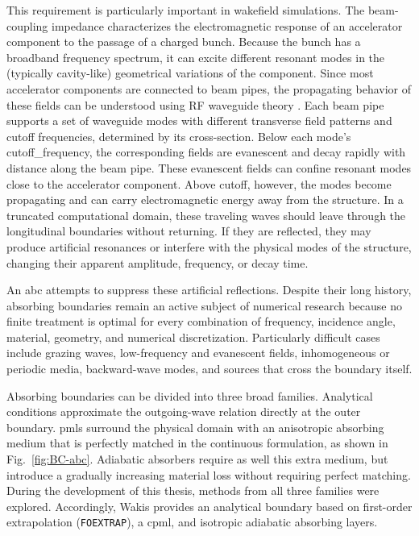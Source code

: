 This requirement is particularly important in wakefield simulations. The beam-coupling impedance characterizes the electromagnetic response of an accelerator component to the passage of a charged bunch. Because the bunch has a broadband frequency spectrum, it can excite different resonant modes in the (typically cavity-like) geometrical variations of the component. Since most accelerator components are connected to beam pipes, the propagating behavior of these fields can be understood using RF waveguide theory \cite{jensen_rf_2014}. Each beam pipe supports a set of \gls{waveguide modes} with different transverse field patterns and cutoff frequencies, determined by its cross-section. Below each mode's \gls{cutoff_frequency}, the corresponding fields are evanescent and decay rapidly with distance along the beam pipe. These evanescent fields can confine resonant modes close to the accelerator component. Above cutoff, however, the modes become propagating and can carry electromagnetic energy
away from the structure. In a truncated computational domain, these traveling waves should leave through the longitudinal boundaries without returning. If they are reflected, they may produce artificial resonances or interfere with the physical modes of the structure, changing their apparent amplitude, frequency, or decay time.

An \gls{abc} attempts to suppress these artificial reflections. Despite their long history, absorbing boundaries remain an active subject of numerical research because no finite treatment is optimal for every combination of frequency, incidence angle, material, geometry, and numerical discretization. Particularly difficult cases include grazing waves, low-frequency and evanescent fields, inhomogeneous or periodic media, backward-wave modes, and sources that cross the boundary itself.

Absorbing boundaries can be divided into three broad families. Analytical conditions approximate the outgoing-wave relation directly at the outer boundary. \Glspl{pml} surround the physical domain with an anisotropic absorbing medium that is perfectly matched in the continuous formulation, as shown in Fig.~\ref{fig:BC-abc}. Adiabatic absorbers require as well this extra medium, but introduce a gradually increasing material loss without requiring perfect matching. During the development of this thesis, methods from all three families were explored. Accordingly, Wakis provides an analytical boundary based on first-order extrapolation (\texttt{FOEXTRAP}), a \gls{cpml}, and isotropic adiabatic absorbing layers.


